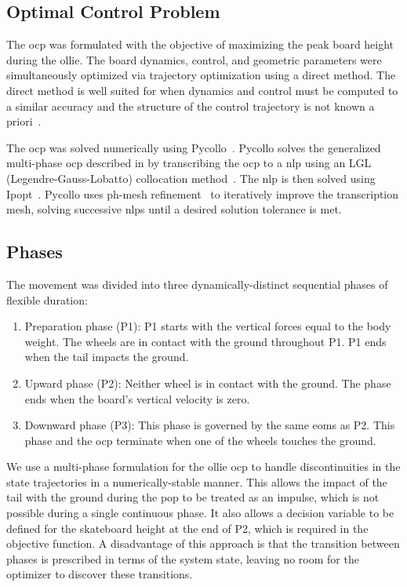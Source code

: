 \documentclass[default,iicol,pdflatex]{sn-jnl}
\begin{document}
\subsection{Optimal Control Problem} \label{sec:ocp}
The \gls{ocp} was formulated with the objective of maximizing the peak board height during the ollie. The board dynamics, control, and geometric parameters were simultaneously optimized via trajectory optimization using a direct method.
The direct method is well suited for when dynamics and control must be computed to a similar accuracy and the structure of the control trajectory is not known a priori~\cite{kelly_introduction_2017}.

The \gls{ocp} was solved numerically using Pycollo~\cite{brockie_predictive_2021}. Pycollo solves the generalized multi-phase \gls{ocp} described in \citet{betts_practical_2010} by transcribing the \gls{ocp} to a \gls{nlp} using an LGL (Legendre-Gauss-Lobatto) collocation method~\cite{betts_using_2016}. The \gls{nlp} is then solved using Ipopt~\cite{biegler_large-scale_2009}. Pycollo uses ph-mesh refinement~\cite{patterson_ph_2015} to iteratively improve the transcription mesh, solving successive \glspl{nlp} until a desired solution tolerance is met.

\subsection{Phases} \label{s_phases}

The movement was divided into three dynamically-distinct sequential phases of flexible duration:
\begin{enumerate} \label{n_phases}
  \item Preparation phase (P1): P1 starts with the vertical forces equal to the body weight. The wheels are in contact with the ground throughout P1. P1 ends when the tail impacts the ground.
  \item Upward phase (P2): Neither wheel is in contact with the ground. The phase ends when the board's vertical velocity is zero.
  \item Downward phase (P3): This phase is governed by the same \glspl{eom} as P2. This phase and the \gls{ocp} terminate when one of the wheels touches the ground.
\end{enumerate}

We use a multi-phase formulation for the ollie \gls{ocp} to handle discontinuities in the state trajectories in a numerically-stable manner. This allows the impact of the tail with the ground during the pop to be treated as an impulse, which is not possible during a single continuous phase. It also allows a decision variable to be defined for the skateboard height at the end of P2, which is required in the objective function. A disadvantage of this approach is that the transition between phases is prescribed in terms of the system state, leaving no room for the optimizer to discover these transitions.
\end{document}
